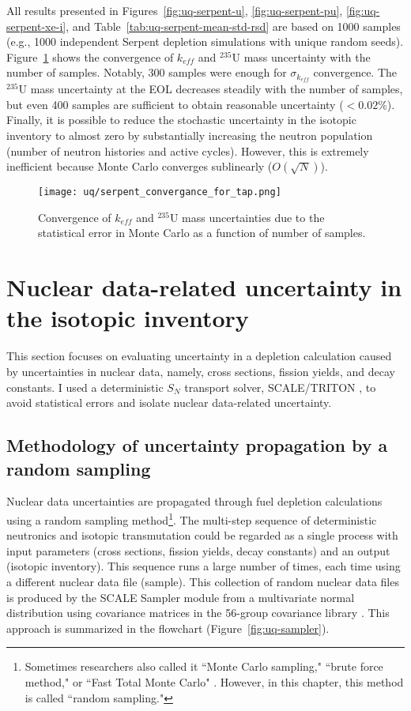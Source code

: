 All results presented in Figures~\ref{fig:uq-serpent-u},  
\ref{fig:uq-serpent-pu}, \ref{fig:uq-serpent-xe-i}, and  
Table~\ref{tab:uq-serpent-mean-std-rsd} are based on 1000 samples (e.g., 1000 
independent Serpent depletion simulations with unique random seeds). 
Figure~\ref{fig:uq-serpent-convergence} shows the 
convergence of $k_{eff}$ and $^{235}$U mass uncertainty with the number of 
samples. Notably, 300 samples were enough for $\sigma_{k_{eff}}$ convergence. 
The $^{235}$U mass uncertainty at the \gls{EOL} decreases steadily 
with the number of samples, but even 400 samples are sufficient to obtain 
reasonable uncertainty ($<0.02$\%). 
Finally, it is possible to reduce the stochastic uncertainty in the isotopic 
inventory to almost zero by substantially increasing the neutron population 
(number of neutron histories and active cycles). However, this is extremely 
inefficient because Monte Carlo converges sublinearly ($O(\sqrt{N})$).
\begin{figure}[htp!] %
	\centering
	\texttt{[image: uq/serpent\_convergance\_for\_tap.png]}
	\caption{Convergence of $k_{eff}$ and $^{235}$U mass uncertainties due to 
		the statistical error in Monte Carlo as a function of number of 
		samples.}
	\label{fig:uq-serpent-convergence}
\end{figure}
\FloatBarrier


\section{Nuclear data-related uncertainty in the isotopic inventory}
This section focuses on evaluating uncertainty in a depletion calculation 
caused by uncertainties in nuclear data, namely, cross sections, fission 
yields, and decay constants. I used a deterministic $S_N$ transport solver, 
SCALE/TRITON \cite{rearden_scale_2018}, to avoid statistical errors and 
isolate nuclear data-related uncertainty.

\subsection{Methodology of uncertainty propagation by a random sampling}
Nuclear data uncertainties are propagated through fuel depletion calculations 
using a random sampling method\footnote{Sometimes researchers also 
	called it ``Monte Carlo sampling," \cite{radaideh_using_2019} ``brute 
	force method,"\cite{garcia-herranz_propagation_2008} or ``Fast Total Monte 
	Carlo" \cite{rochman_nuclear_2014}. However, in this chapter, this method 
	is 
	called ``random  sampling."}. The multi-step sequence of deterministic 
neutronics and isotopic transmutation could be regarded as a single 
process with input parameters (cross sections, fission yields, decay 
constants) and an output (isotopic inventory). This sequence runs a 
large number of times, each time using a different nuclear data file (sample). 
This collection of random nuclear data files is produced by the SCALE Sampler 
module from a multivariate normal distribution using covariance matrices in 
the 56-group covariance library \cite{rearden_scale_2018, 
	radaideh_novel_2019}. This approach is summarized in the flowchart 
(Figure~\ref{fig:uq-sampler}).

